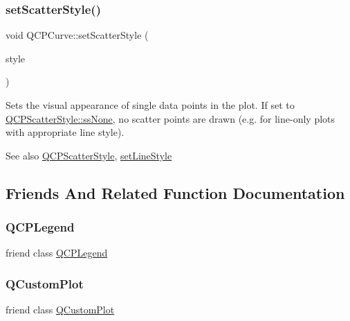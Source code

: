 \subsubsection{\texorpdfstring{set\+Scatter\+Style()}{setScatterStyle()}}
{\footnotesize\ttfamily void Q\+C\+P\+Curve\+::set\+Scatter\+Style (\begin{DoxyParamCaption}\item[{const \hyperlink{class_q_c_p_scatter_style}{Q\+C\+P\+Scatter\+Style} \&}]{style }\end{DoxyParamCaption})}

Sets the visual appearance of single data points in the plot. If set to \hyperlink{class_q_c_p_scatter_style_adb31525af6b680e6f1b7472e43859349abd144c291ca274f77053ec68cab6c022}{Q\+C\+P\+Scatter\+Style\+::ss\+None}, no scatter points are drawn (e.\+g. for line-\/only plots with appropriate line style).

\begin{DoxySeeAlso}{See also}
\hyperlink{class_q_c_p_scatter_style}{Q\+C\+P\+Scatter\+Style}, \hyperlink{class_q_c_p_curve_a4a377ec863ff81a1875c3094a6177c19}{set\+Line\+Style} 
\end{DoxySeeAlso}


\subsection{Friends And Related Function Documentation}
\mbox{\label{class_q_c_p_curve_a8429035e7adfbd7f05805a6530ad5e3b}} 
\subsubsection{\texorpdfstring{Q\+C\+P\+Legend}{QCPLegend}}
{\footnotesize\ttfamily friend class \hyperlink{class_q_c_p_legend}{Q\+C\+P\+Legend}\hspace{0.3cm}{\ttfamily [friend]}}

\mbox{\label{class_q_c_p_curve_a1cdf9df76adcfae45261690aa0ca2198}} 
\subsubsection{\texorpdfstring{Q\+Custom\+Plot}{QCustomPlot}}
{\footnotesize\ttfamily friend class \hyperlink{class_q_custom_plot}{Q\+Custom\+Plot}\hspace{0.3cm}{\ttfamily [friend]}}



